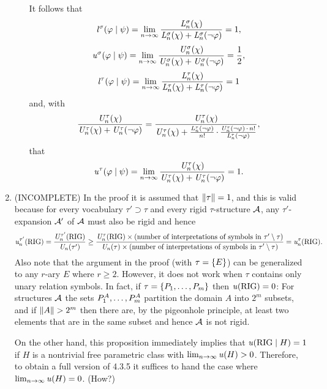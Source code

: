\begin{enumerate}[1.]
\begin{enumerate}[(1)]
It follows that
\[
\lprob^\sigma(\varphi \wrt \psi) = \lim_{n \to \infty} \frac{\lclass{n}^\sigma(\chi)}{\lclass{n}^\sigma(\chi) + \lclass{n}^\sigma(\neg\varphi)} = 1,
\]
\[
\uprob^\sigma(\varphi \wrt \psi) = \lim_{n \to \infty} \frac{\uclass{n}^\sigma(\chi)}{\uclass{n}^\sigma(\chi) + \uclass{n}^\sigma(\neg\varphi)} = \frac{1}{2},
\]
\[
\lprob^\tau(\varphi \wrt \psi) = \lim_{n \to \infty} \frac{\lclass{n}^\tau(\chi)}{\lclass{n}^\tau(\chi) + \lclass{n}^\tau(\neg\varphi)} = 1
\]
and, with
\[
\frac{\mathit{U}_{n}^\tau(\chi)}{\mathit{U}_{n}^\tau(\chi) + \mathit{U}_{n}^\tau(\neg\varphi)} = \frac{\mathit{U}_{n}^\tau(\chi)}{\mathit{U}_{n}^\tau(\chi) + \frac{\mathit{L}_{n}^\tau(\neg\varphi)}{n!} \mathop{\cdot} \frac{\mathit{U}_{n}^\tau(\neg\varphi) \mathop{\cdot} n!}{\mathit{L}_{n}^\tau(\neg\varphi)}},
\]
that
\[
\uprob^\tau(\varphi \wrt \psi) = \lim_{n \to \infty} \frac{\uclass{n}^\tau(\chi)}{\uclass{n}^\tau(\chi) + \uclass{n}^\tau(\neg\varphi)} = 1.
\]
\end{enumerate}
%
\item {} (INCOMPLETE) In the proof it is assumed that $\|\tau\| = 1$, and this is valid because for every vocabulary $\tau' \supset \tau$ and every rigid $\tau$-structure $\mathcal{A}$, any $\tau'$-expansion $\mathcal{A}'$ of $\mathcal{A}$ must also be rigid and hence
\[
\uprob[n]^{\tau'}(\rigid) = \frac{\uclass{n}^{\tau'}(\rigid)}{\uclass{n}(\tau')} \geq \frac{\uclass{n}^\tau(\rigid) \times \text{(number of interpretations of symbols in \mathmode{\tau' \setminus \tau})}}{\uclass{n}(\tau) \times \text{(number of interpretations of symbols in \mathmode{\tau' \setminus \tau})}} = \uprob[n]^{\tau}(\rigid).
\]
Also note that the argument in the proof (with $\tau = {\{E\}}$) can be generalized to any $r$-ary $E$ where $r \geq 2$. However, it does not work when $\tau$ contains only unary relation symbols. In fact, if $\tau = {\{P_1, \ldots, P_m\}}$ then $\uprob(\rigid) = 0$: For structures $\mathcal{A}$ the sets $P_1^{A}, \ldots, P_m^{A}$ partition the domain $A$ into $2^m$ subsets, and if $\|A\| > 2^m$ then there are, by the pigeonhole principle, at least two elements that are in the same subset and hence $\mathcal{A}$ is not rigid.

On the other hand, this proposition immediately implies that $\uprob(\rigid \wrt H) = 1$ if $H$ is a nontrivial free parametric class with $\lim_{n \to \infty} \uprob(H) > 0$. Therefore, to obtain a full version of 4.3.5 it suffices to hand the case where $\lim_{n \to \infty} \uprob(H) = 0$. (How?)
%
\end{enumerate}


